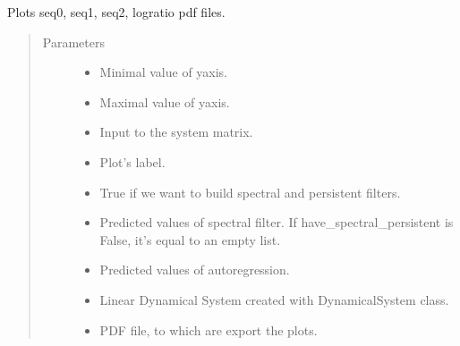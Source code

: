 \documentclass[letterpaper,10pt,english]{sphinxmanual}
\begin{document}

\begin{fulllineitems}
\label{\detokenize{LDS:LDS.OnlineLDS_library.plot_p1}}
\sphinxAtStartPar
Plots seq0, seq1, seq2, logratio pdf files.
\begin{quote}\begin{description}
\item[{Parameters}] \leavevmode\begin{itemize}
\item {} 
\sphinxAtStartPar
{} \textendash{} Minimal value of y\sphinxhyphen{}axis.

\item {} 
\sphinxAtStartPar
{} \textendash{} Maximal value of y\sphinxhyphen{}axis.

\item {} 
\sphinxAtStartPar
{} \textendash{} Input to the system matrix.

\item {} 
\sphinxAtStartPar
{} \textendash{} Plot’s label.

\item {} 
\sphinxAtStartPar
{} \textendash{} True if we want to build spectral and persistent filters.

\item {} 
\sphinxAtStartPar
{} \textendash{} Predicted values of spectral filter. If
have\_spectral\_persistent is False, it’s equal to an empty list.

\item {} 
\sphinxAtStartPar
{} \textendash{} Predicted values of auto\sphinxhyphen{}regression.

\item {} 
\sphinxAtStartPar
{} \textendash{} Linear Dynamical System created with DynamicalSystem class.

\item {} 
\sphinxAtStartPar
{} \textendash{} PDF file, to which are export the plots.

\end{itemize}

\end{description}\end{quote}

\end{fulllineitems}
\end{document}
